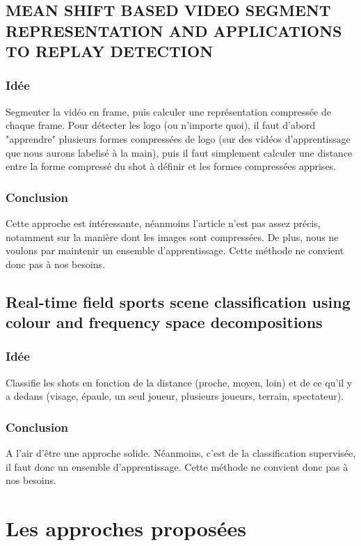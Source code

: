 \documentclass[11pt]{article}
\begin{document}
\subsection{MEAN SHIFT BASED VIDEO SEGMENT REPRESENTATION AND APPLICATIONS TO REPLAY DETECTION}
\label{sec-4-4}

\subsubsection{Idée}
\label{sec-4-4-1}
Segmenter la vidéo en frame, puis calculer une représentation compressée de chaque frame. 
Pour détecter les logo (ou n'importe quoi), il faut d'abord "apprendre" plusieurs formes
compressées de logo (sur des vidéos d'apprentissage que nous aurons labelisé à la main), 
puis il faut simplement calculer une distance entre la forme compressé du shot à définir
et les formes compressées apprises.

\subsubsection{Conclusion}
\label{sec-4-4-2}
Cette approche est intéressante, néanmoins l’article n’est pas assez précis, notamment 
sur la manière dont les images sont compressées. De plus, nous ne voulons par maintenir 
un ensemble d’apprentissage. Cette méthode ne convient donc pas à nos besoins.

\subsection{Real-time field sports scene classification using colour and frequency space decompositions}
\label{sec-4-5}
\subsubsection{Idée}
\label{sec-4-5-1}
Classifie les shots en fonction de la distance (proche, moyen, loin) et de ce qu'il y a 
dedans (visage, épaule, un seul joueur,  plusieurs joueurs, terrain, spectateur). 

\subsubsection{Conclusion}
\label{sec-4-5-2}
A l'air d'être une approche solide. Néanmoins, c'est de la classification supervisée,
il faut donc un ensemble d'apprentissage. Cette méthode ne convient donc pas à nos besoins.


\section{Les approches proposées}
\label{sec-5}
\end{document}
